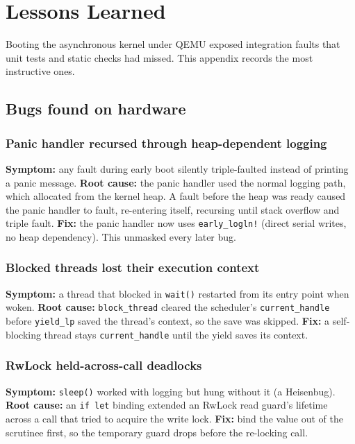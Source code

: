 \chapter{Lessons Learned}

Booting the asynchronous kernel under QEMU exposed integration faults that unit
tests and static checks had missed. This appendix records the most instructive
ones.

\section{Bugs found on hardware}

\subsection{Panic handler recursed through heap-dependent logging}

\textbf{Symptom:} any fault during early boot silently triple-faulted instead of
printing a panic message. \textbf{Root cause:} the panic handler used the normal
logging path, which allocated from the kernel heap. A fault before the heap was
ready caused the panic handler to fault, re-entering itself, recursing until
stack overflow and triple fault. \textbf{Fix:} the panic handler now uses
\texttt{early\_logln!} (direct serial writes, no heap dependency). This unmasked
every later bug.

\subsection{Blocked threads lost their execution context}

\textbf{Symptom:} a thread that blocked in \texttt{wait()} restarted from its
entry point when woken. \textbf{Root cause:} \texttt{block\_thread} cleared the
scheduler's \texttt{current\_handle} before \texttt{yield\_lp} saved the
thread's context, so the save was skipped. \textbf{Fix:} a self-blocking thread
stays \texttt{current\_handle} until the yield saves its context.

\subsection{RwLock held-across-call deadlocks}

\textbf{Symptom:} \texttt{sleep()} worked with logging but hung without it
(a Heisenbug). \textbf{Root cause:} an \texttt{if let} binding extended an
RwLock read guard's lifetime across a call that tried to acquire the write lock.
\textbf{Fix:} bind the value out of the scrutinee first, so the temporary guard
drops before the re-locking call.

